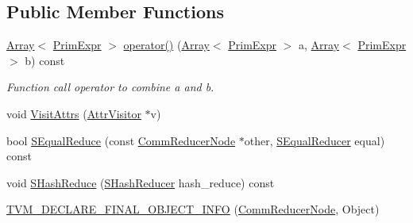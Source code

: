 \subsection*{Public Member Functions}
\begin{DoxyCompactItemize}
\item 
\hyperlink{classtvm_1_1Array}{Array}$<$ \hyperlink{classtvm_1_1PrimExpr}{Prim\+Expr} $>$ \hyperlink{classtvm_1_1tir_1_1CommReducerNode_a676a4b831713ce7a8ad27dbbdc85864e}{operator()} (\hyperlink{classtvm_1_1Array}{Array}$<$ \hyperlink{classtvm_1_1PrimExpr}{Prim\+Expr} $>$ a, \hyperlink{classtvm_1_1Array}{Array}$<$ \hyperlink{classtvm_1_1PrimExpr}{Prim\+Expr} $>$ b) const 
\begin{DoxyCompactList}\small\item\em Function call operator to combine a and b. \end{DoxyCompactList}\item 
void \hyperlink{classtvm_1_1tir_1_1CommReducerNode_a91c948da93ea84120c01034af7d867d5}{Visit\+Attrs} (\hyperlink{classtvm_1_1AttrVisitor}{Attr\+Visitor} $\ast$v)
\item 
bool \hyperlink{classtvm_1_1tir_1_1CommReducerNode_a7a679454a48aeb1def1ab92c9f2c923d}{S\+Equal\+Reduce} (const \hyperlink{classtvm_1_1tir_1_1CommReducerNode}{Comm\+Reducer\+Node} $\ast$other, \hyperlink{classtvm_1_1SEqualReducer}{S\+Equal\+Reducer} equal) const 
\item 
void \hyperlink{classtvm_1_1tir_1_1CommReducerNode_a663cc97035b41c567fd0bb4b90ee2f82}{S\+Hash\+Reduce} (\hyperlink{classtvm_1_1SHashReducer}{S\+Hash\+Reducer} hash\+\_\+reduce) const 
\item 
\hyperlink{classtvm_1_1tir_1_1CommReducerNode_a7fcf5b95cf5c253b018e6015a383bcd3}{T\+V\+M\+\_\+\+D\+E\+C\+L\+A\+R\+E\+\_\+\+F\+I\+N\+A\+L\+\_\+\+O\+B\+J\+E\+C\+T\+\_\+\+I\+N\+FO} (\hyperlink{classtvm_1_1tir_1_1CommReducerNode}{Comm\+Reducer\+Node}, Object)
\end{DoxyCompactItemize}
